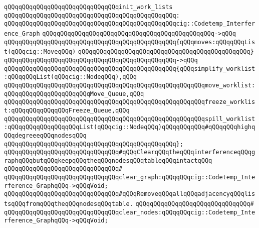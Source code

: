\verb|qQQqqQQqqQQqqQQqqQQqqQQqqQQqqQQqinit_work_lists|\newline
\verb|qQQqqQQqqQQqqQQqqQQqqQQqqQQqqQQqqQQqqQQqqQQqqQQq:|\newline
\verb|qQQqqQQqqQQqqQQqqQQqqQQqqQQqqQQqqQQqqQQqqQQqqQQqcig::Codetemp_Interference_Graph|\newline
\verb|qQQqqQQqqQQqqQQqqQQqqQQqqQQqqQQqqQQqqQQqqQQqqQQq->qQQq|\newline
\verb|qQQqqQQqqQQqqQQqqQQqqQQqqQQqqQQqqQQqqQQqqQQqqQQq{qQQqmoves:qQQqqQQqList(qQQqcig::MoveqQQq)|\newline
\verb|qQQqqQQqqQQqqQQqqQQqqQQqqQQqqQQqqQQqqQQqqQQqqQQq}|\newline
\verb|qQQqqQQqqQQqqQQqqQQqqQQqqQQqqQQqqQQqqQQqqQQqqQQq->qQQq|\newline
\verb|qQQqqQQqqQQqqQQqqQQqqQQqqQQqqQQqqQQqqQQqqQQqqQQq{qQQqsimplify_worklist:qQQqqQQqList(qQQqcig::NodeqQQq),qQQq|\newline
\verb|qQQqqQQqqQQqqQQqqQQqqQQqqQQqqQQqqQQqqQQqqQQqqQQqqQQqqQQqmove_worklist:qQQqqQQqqQQqqQQqqQQqqQQqMove_Queue,qQQq|\newline
\verb|qQQqqQQqqQQqqQQqqQQqqQQqqQQqqQQqqQQqqQQqqQQqqQQqqQQqqQQqfreeze_worklist:qQQqqQQqqQQqqQQqFreeze_Queue,qQQq|\newline
\verb|qQQqqQQqqQQqqQQqqQQqqQQqqQQqqQQqqQQqqQQqqQQqqQQqqQQqqQQqspill_worklist:qQQqqQQqqQQqqQQqqQQqList(qQQqcig::NodeqQQq)qQQqqQQqqQQq#qQQqqQQqhighqQQqdegreeeqQQqnodesqQQq|\newline
\verb|qQQqqQQqqQQqqQQqqQQqqQQqqQQqqQQqqQQqqQQqqQQqqQQq};|\newline
\newline
\newline
\verb|qQQqqQQqqQQqqQQqqQQqqQQqqQQqqQQq#qQQqClearqQQqtheqQQqinterferenceqQQqgraphqQQqbutqQQqkeepqQQqtheqQQqnodesqQQqtableqQQqintactqQQq|\newline
\verb|qQQqqQQqqQQqqQQqqQQqqQQqqQQqqQQq#|\newline
\verb|qQQqqQQqqQQqqQQqqQQqqQQqqQQqqQQqclear_graph:qQQqqQQqcig::Codetemp_Interference_GraphqQQq->qQQqVoid;|\newline
\newline
\newline
\verb|qQQqqQQqqQQqqQQqqQQqqQQqqQQqqQQq#qQQqRemoveqQQqallqQQqadjacencyqQQqlistsqQQqfromqQQqtheqQQqnodesqQQqtable.|\newline
\verb|qQQqqQQqqQQqqQQqqQQqqQQqqQQqqQQq#|\newline
\verb|qQQqqQQqqQQqqQQqqQQqqQQqqQQqqQQqclear_nodes:qQQqqQQqcig::Codetemp_Interference_GraphqQQq->qQQqVoid;|\newline
